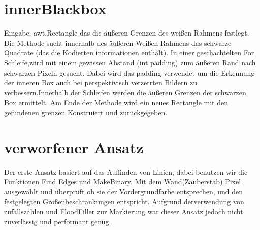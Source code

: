 \documentclass[a4paper,11pt,parskip]{article}
\begin{document}
\section{innerBlackbox}
Eingabe: awt.Rectangle das die äußeren Grenzen des weißen Rahmens festlegt.
Die Methode sucht innerhalb des äußeren Weißen Rahmens das schwarze Quadrate (das die Kodierten informationen enthält). In einer geschachtelten For Schleife,wird mit einem gewissen Abstand (int padding) zum äußeren Rand nach schwarzen Pixeln gesucht. Dabei wird das padding verwendet um die Erkennung der inneren Box auch bei perspektivisch verzerrten Bildern zu verbessern.Innerhalb der Schleifen werden die äußeren Grenzen der schwarzen Box ermittelt. Am Ende der Methode wird ein neues Rectangle mit den gefundenen grenzen Konstruiert und zurückgegeben.

\section{verworfener Ansatz}
Der erste Ansatz basiert auf das Auffinden von Linien, dabei benutzen wir die Funktionen Find Edges und MakeBinary. Mit dem Wand(Zauberstab) Pixel ausgewählt und überprüft ob sie der Vordergrundfarbe entsprechen, und den festgelegten Größenbeschränkungen entspricht. Aufgrund derverwendung von zufallszahlen und FloodFiller zur Markierung war dieser Ansatz jedoch nicht zuverlässig und performant genug.
\end{document}
